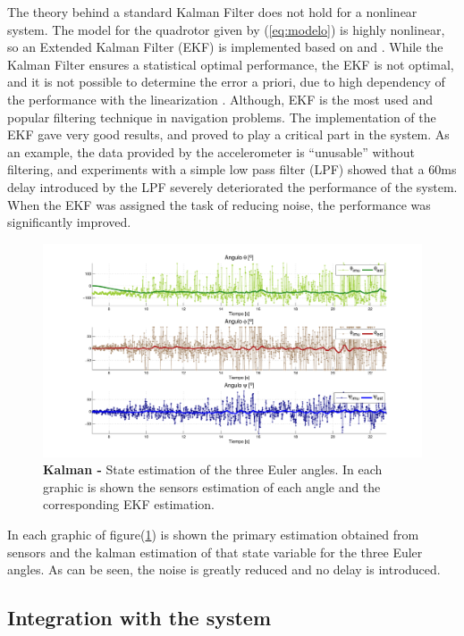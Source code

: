 \documentclass[conference]{IEEEtran}
\newcommand{\refp}[1]{(\ref{#1})}
\begin{document}
The theory behind a standard Kalman Filter does not hold for a nonlinear system. The model for the quadrotor given by \refp{eq:modelo} is highly nonlinear, so an Extended Kalman Filter (EKF) is implemented based on \cite{bib:kalman} and \cite{bib:kalman2}. While the Kalman Filter ensures a statistical optimal performance, the EKF is not optimal, and it is not possible to determine the error a priori, due to high dependency of the performance with the linearization \cite{bib:kay}. Although, EKF is the most used and popular filtering technique in navigation problems. The implementation of the EKF gave very good results, and proved to play a critical part in the system. As an example, the data provided by the accelerometer is ``unusable'' without filtering, and experiments with a simple low pass filter (LPF) showed that a 60ms delay introduced by the LPF severely deteriorated the performance of the system. When the EKF was assigned the task of reducing noise, the performance was significantly improved.

 \begin{figure}
	\hspace{-.8cm}
	\includegraphics[width=1.12\columnwidth]{./pics_paper/kalman.pdf}
	\caption{\textbf{Kalman -} State estimation of the three Euler angles. In each graphic is shown the sensors estimation of each angle and the corresponding EKF estimation.}
	\label{fig:kalman}
\end{figure}

In each graphic of figure\refp{fig:kalman} is shown the primary estimation obtained from sensors and the kalman estimation of that state variable for the three Euler angles. As can be seen, the noise is greatly reduced and no delay is introduced.

\subsection{Integration with the system}
\label{sec:kalman-integration}
\end{document}
